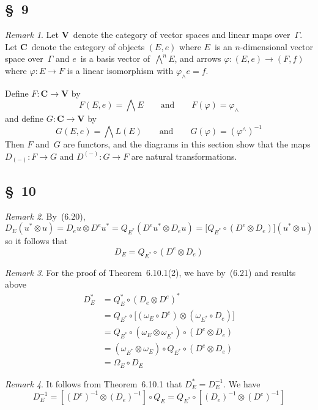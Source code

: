 \documentclass[letterpaper,12pt]{article}
\newcommand{\after}{\circ}
\newcommand{\tprod}{\otimes}
\newcommand{\eprod}{\wedge}
\newcommand{\bigeprod}{\bigwedge}
\newcommand{\medeprod}{{\textstyle\bigeprod}}
\newcommand{\cat}[1]{\mathbf{#1}}
\theoremstyle{definition}
\theoremstyle{remark}
\newtheorem*{rmk}{Remark}
\begin{document}
\subsection*{\S~9}
\begin{rmk}
Let \(\cat{V}\)~denote the category of vector spaces and linear maps over~\(\Gamma\). Let \(\cat{C}\)~denote the category of objects \((E,e)\) where \(E\)~is an \(n\)-dimensional vector space over~\(\Gamma\) and \(e\)~is a basis vector of~\(\medeprod^n E\), and arrows \(\varphi:(E,e)\to(F,f)\) where \(\varphi:E\to F\) is a linear isomorphism with \(\varphi_{\eprod}e=f\).

Define \(F:\cat{C}\to\cat{V}\) by
\[F(E,e)=\medeprod E\qquad\text{and}\qquad F(\varphi)=\varphi_{\eprod}\]
and define \(G:\cat{C}\to\cat{V}\) by
\[G(E,e)=\medeprod L(E)\qquad\text{and}\qquad G(\varphi)=(\varphi^{\eprod})^{-1}\]
Then \(F\) and~\(G\) are functors, and the diagrams in this section show that the maps \(D_{(-)}:F\to G\) and \(D^{(-)}:G\to F\) are natural transformations.
\end{rmk}

\subsection*{\S~10}
\begin{rmk}
By~(6.20),
\[D_E(u^*\tprod u)=D_e u\tprod D^e u^*=Q_{E^*}(D^e u^*\tprod D_e u)=\bigl[Q_{E^*}\after(D^e\tprod D_e)\bigr](u^*\tprod u)\]
so it follows that
\[D_E=Q_{E^*}\after(D^e\tprod D_e)\]
\end{rmk}

\begin{rmk}
For the proof of Theorem~6.10.1(2), we have by~(6.21) and results above
\begin{align*}
D_E^*&=Q_E^*\after(D_e\tprod D^e)^*\\
	&=Q_{E^*}\after\bigl[(\omega_E\after D^e)\tprod(\omega_{E^*}\after D_e)\bigr]\\
	&=Q_{E^*}\after(\omega_E\tprod\omega_{E^*})\after(D^e\tprod D_e)\\
	&=(\omega_{E^*}\tprod\omega_E)\after Q_{E^*}\after(D^e\tprod D_e)\\
	&=\Omega_E\after D_E
\end{align*}
\end{rmk}

\begin{rmk}
It follows from Theorem~6.10.1 that \(D_E^*=D_E^{-1}\). We have
\[D_E^{-1}=[(D^e)^{-1}\tprod(D_e)^{-1}]\after Q_E=Q_{E^*}\after[(D_e)^{-1}\tprod(D^e)^{-1}]\]
\end{rmk}
\end{document}
